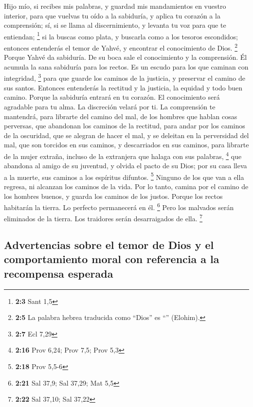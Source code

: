  Hijo mío, si recibes mis palabras, y guardad mis
mandamientos en vuestro interior,  para que vuelvas tu
oído a la sabiduría, y aplica tu corazón a la comprensión;
 sí, si se llama al discernimiento, y levanta tu voz para
que te entiendan; \footnote{\textbf{2:3} Sant 1,5}  si la
buscas como plata, y buscarla como a los tesoros escondidos;
 entonces entenderás el temor de Yahvé, y encontrar el
conocimiento de Dios. \footnote{\textbf{2:5} La palabra hebrea traducida
  como ``Dios'' es ``'' (Elohim).}  Porque
Yahvé da sabiduría. De su boca sale el conocimiento y la comprensión.
 Él acumula la sana sabiduría para los rectos. Es un
escudo para los que caminan con integridad, \footnote{\textbf{2:7} Ecl
  7,29}  para que guarde los caminos de la justicia, y
preservar el camino de sus santos.  Entonces entenderás la
rectitud y la justicia, la equidad y todo buen camino. 
Porque la sabiduría entrará en tu corazón. El conocimiento será
agradable para tu alma.  La discreción velará por ti. La
comprensión te mantendrá,  para librarte del camino del
mal, de los hombres que hablan cosas perversas,  que
abandonan los caminos de la rectitud, para andar por los caminos de la
oscuridad,  que se alegran de hacer el mal, y se deleitan
en la perversidad del mal,  que son torcidos en sus
caminos, y descarriados en sus caminos,  para librarte de
la mujer extraña, incluso de la extranjera que halaga con sus palabras,
\footnote{\textbf{2:16} Prov 6,24; Prov 7,5; Prov 5,3} 
que abandona al amigo de su juventud, y olvida el pacto de su Dios;
 por su casa lleva a la muerte, sus caminos a los
espíritus difuntos. \footnote{\textbf{2:18} Prov 5,5-6} 
Ninguno de los que van a ella regresa, ni alcanzan los caminos de la
vida.  Por lo tanto, camina por el camino de los hombres
buenos, y guarda los caminos de los justos.  Porque los
rectos habitarán la tierra. Lo perfecto permanecerá en él. \footnote{\textbf{2:21}
  Sal 37,9; Sal 37,29; Mat 5,5}  Pero los malvados serán
eliminados de la tierra. Los traidores serán desarraigados de ella.
\footnote{\textbf{2:22} Sal 37,10; Sal 37,22}

\hypertarget{advertencias-sobre-el-temor-de-dios-y-el-comportamiento-moral-con-referencia-a-la-recompensa-esperada}{%
\subsection{Advertencias sobre el temor de Dios y el comportamiento
moral con referencia a la recompensa
esperada}\label{advertencias-sobre-el-temor-de-dios-y-el-comportamiento-moral-con-referencia-a-la-recompensa-esperada}}

